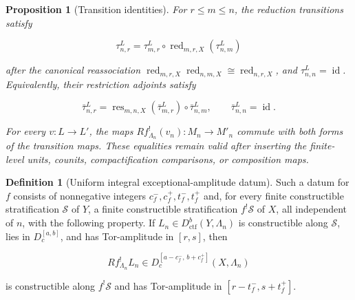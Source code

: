 \documentclass[10pt]{article}
\newtheorem{proposition}[theorem]{Proposition}
\theoremstyle{definition}
\newtheorem{definition}[theorem]{Definition}
\newcommand{\Dctf}{D^b_{\mathrm{ctf}}}
\newcommand{\red}{\operatorname{red}}
\begin{document}
\begin{proposition}[Transition identities]
For \(r\leq m\leq n\), the reduction transitions satisfy

\[
 \tau^L_{n,r}=
 \tau^L_{m,r}\circ\red_{m,r,X}(\tau^L_{n,m})
\]

after the canonical reassociation
\(\red_{m,r,X}\red_{n,m,X}\cong\red_{n,r,X}\), and
\(\tau^L_{n,n}=\operatorname{id}\).  Equivalently, their restriction
adjoints satisfy

\[
 \bar\tau^L_{n,r}=
 \operatorname{res}_{m,n,X}(\bar\tau^L_{m,r})
 \circ\bar\tau^L_{n,m},
 \qquad \bar\tau^L_{n,n}=\operatorname{id}.
\]

For every \(v:L\to L'\), the maps
\(Rf^!_{\Lambda_n}(v_n):M_n\to M'_n\) commute with both forms of the
transition maps.  These equalities remain valid after inserting the
finite-level units, counits, compactification comparisons, or composition
maps.
\end{proposition}

\begin{definition}[Uniform integral exceptional-amplitude datum]
Such a datum for \(f\) consists of nonnegative integers
\(c_f^-,c_f^+,t_f^-,t_f^+\) and, for every finite constructible
stratification \(\mathcal S\) of \(Y\), a finite constructible
stratification \(f^!\mathcal S\) of \(X\), all independent of \(n\), with
the following property.  If \(L_n\in\Dctf(Y,\Lambda_n)\) is constructible
along \(\mathcal S\), lies in \(D_c^{[a,b]}\), and has Tor-amplitude in
\([r,s]\), then

\[
 Rf^!_{\Lambda_n}L_n\in
 D_c^{[a-c_f^-,\,b+c_f^+]}(X,\Lambda_n)
\]

is constructible along \(f^!\mathcal S\) and has Tor-amplitude in
\([r-t_f^-,s+t_f^+]\).
\end{definition}
\end{document}
